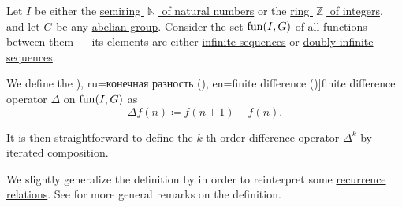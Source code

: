 \begin{definition}\label{def:finite_difference_operator}\mimprovised
  Let \( I \) be either the \hyperref[def:natural_numbers]{semiring \( \BbbN \) of natural numbers} or the \hyperref[def:integers]{ring \( \BbbZ \) of integers}, and let \( G \) be any \hyperref[def:abelian_group]{abelian group}. Consider the set \( \operatorname{fun}(I, G) \) of all functions between them --- its elements are either \hyperref[def:sequence]{infinite sequences} or \hyperref[def:doubly_infinite_sequence]{doubly infinite sequences}.

  We define the \term[bg=крайна разлика от ред \( k \) (\cite[21]{Боянов2008ЧислениМетоди}), ru=конечная разность (\cite[11]{Гельфонд1959ИсчислениеКонечныхРазностей}), en=finite difference (\cite[77]{Stanley2012EnumerativeCombinatoricsVol1})]{finite difference} operator \( \Delta \) on \( \operatorname{fun}(I, G) \) as
  \begin{equation}\label{eq:def:finite_difference_operator}
    \Delta f(n) \coloneqq f(n + 1) - f(n).
  \end{equation}

  It is then straightforward to define the \( k \)-th order difference operator \( \Delta^k \) by iterated composition.
\end{definition}
\begin{comments}
  \item We slightly generalize the definition by  in order to reinterpret some \hyperref[def:recurrence_relation]{recurrence relations}. See  for more general remarks on the definition.
\end{comments}


